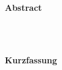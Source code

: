 \thispagestyle{noheader}
\setlength{\columnsep}{1cm}

\begin{multicols}{2}
	\begin{large}
		\textbf{Abstract} \\ \\
	\end{large}
	\blindtext
	\columnbreak \\
	\begin{large}
		\textbf{Kurzfassung} \\ \\
	\end{large}
	\blindtext
\end{multicols}

\newpage